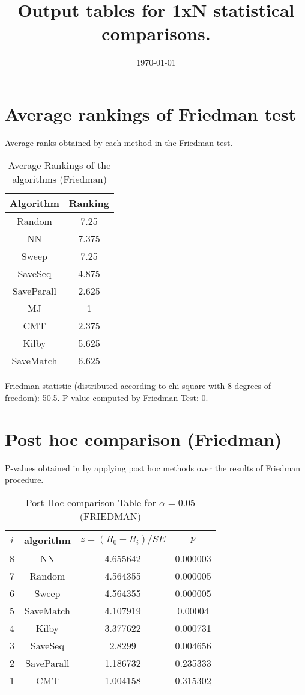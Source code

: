 \documentclass[a4paper,10pt]{article}
\title{Output tables for 1xN statistical comparisons.}
\author{}
\date{\today}
\begin{document}
\begin{landscape}
\pagestyle{empty}
\maketitle
\thispagestyle{empty}

\section{Average rankings of Friedman test}


Average ranks obtained by each method in the Friedman test.

\begin{table}[!htp]
\centering
\begin{tabular}{|c|c|}\hline
Algorithm&Ranking\\\hline
Random&7.25\\NN&7.375\\Sweep&7.25\\SaveSeq&4.875\\SaveParall&2.625\\MJ&1\\CMT&2.375\\Kilby&5.625\\SaveMatch&6.625\\\hline\end{tabular}
\caption{Average Rankings of the algorithms (Friedman)}
\end{table}

Friedman statistic (distributed according to chi-square with 8 degrees of freedom): 50.5. \newline P-value computed by Friedman Test: 0.\newline


\newpage

\section{Post hoc comparison (Friedman)}


P-values obtained in by applying post hoc methods over the results of Friedman procedure.

\begin{table}[!htp]
\centering\footnotesize
\begin{tabular}{cccc}
$i$&algorithm&$z=(R_0 - R_i)/SE$&$p$\\
\hline8&NN&4.655642&0.000003\\7&Random&4.564355&0.000005\\6&Sweep&4.564355&0.000005\\5&SaveMatch&4.107919&0.00004\\4&Kilby&3.377622&0.000731\\3&SaveSeq&2.8299&0.004656\\2&SaveParall&1.186732&0.235333\\1&CMT&1.004158&0.315302\\\hline
\end{tabular}
\caption{Post Hoc comparison Table for $\alpha=0.05$ (FRIEDMAN)}
\end{table}
\newpage


\end{landscape}
\end{document}
